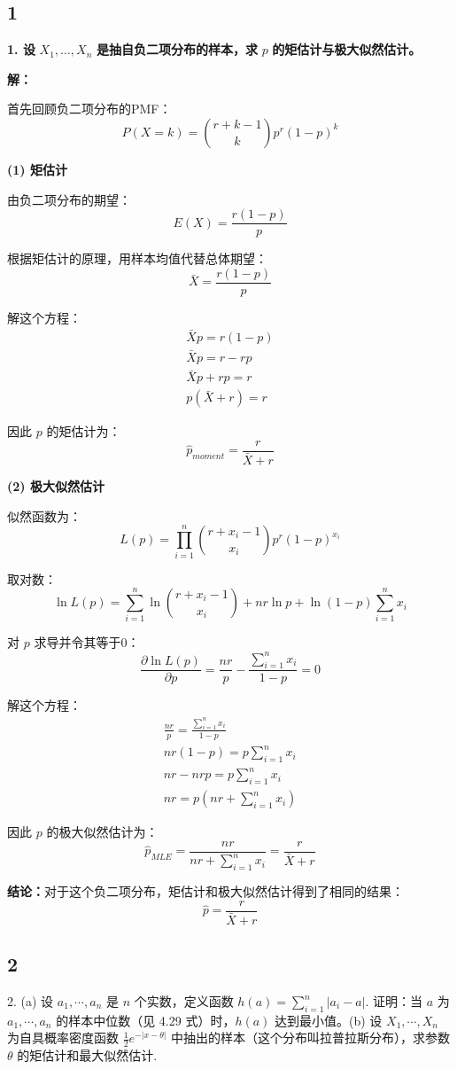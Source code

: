 \documentclass[UTF8]{report}
\theoremstyle{MyLineTheoremStyle} %
\theoremstyle{MyBlockTheoremStyle} %
\theoremstyle{MySubsubsectionStyle} %
\begin{document}
\cleardoublepage

\subsection{1}
\noindent
\textbf{1. 设} $X_1, \ldots, X_n$ \textbf{是抽自负二项分布的样本，求} $p$ \textbf{的矩估计与极大似然估计。}

\noindent
\textbf{解：} 

首先回顾负二项分布的PMF：
$$
P(X=k) = \binom{r+k-1}{k}p^r(1-p)^k
$$

\noindent
\textbf{(1) 矩估计}

由负二项分布的期望：
$$
E(X) = \frac{r(1-p)}{p}
$$

根据矩估计的原理，用样本均值代替总体期望：
$$
\bar{X} = \frac{r(1-p)}{p}
$$

解这个方程：
$$
\begin{gathered}
\bar{X}p = r(1-p) \\
\bar{X}p = r - rp \\
\bar{X}p + rp = r \\
p(\bar{X} + r) = r
\end{gathered}
$$

因此 $p$ 的矩估计为：
$$
\hat{p}_{moment} = \frac{r}{\bar{X} + r}
$$

\noindent
\textbf{(2) 极大似然估计}

似然函数为：
$$
L(p) = \prod_{i=1}^n \binom{r+x_i-1}{x_i}p^r(1-p)^{x_i}
$$

取对数：
$$
\ln L(p) = \sum_{i=1}^n \ln\binom{r+x_i-1}{x_i} + nr\ln p + \ln(1-p)\sum_{i=1}^n x_i
$$

对 $p$ 求导并令其等于0：
$$
\frac{\partial \ln L(p)}{\partial p} = \frac{nr}{p} - \frac{\sum_{i=1}^n x_i}{1-p} = 0
$$

解这个方程：
$$
\begin{gathered}
\frac{nr}{p} = \frac{\sum_{i=1}^n x_i}{1-p} \\
nr(1-p) = p\sum_{i=1}^n x_i \\
nr - nrp = p\sum_{i=1}^n x_i \\
nr = p(nr + \sum_{i=1}^n x_i)
\end{gathered}
$$

因此 $p$ 的极大似然估计为：
$$
\hat{p}_{MLE} = \frac{nr}{nr + \sum_{i=1}^n x_i} = \frac{r}{\bar{X} + r}
$$

\noindent
\textbf{结论：}对于这个负二项分布，矩估计和极大似然估计得到了相同的结果：
$$
\hat{p} = \frac{r}{\bar{X} + r}
$$

\subsection{2}
2. (a) 设 $a_1,\cdots,a_n$ 是 $n$ 个实数，定义函数 $h(a)=\sum_{i=1}^n|a_i-a|$. 证明：当 $a$ 为 $a_1,\cdots,a_n$ 的样本中位数（见 4.29 式）时，$h(a)$ 达到最小值。(b) 设 $X_1,\cdots,X_n$ 为自具概率密度函数 $\frac{1}{2}e^{-|x-\theta|}$ 中抽出的样本（这个分布叫拉普拉斯分布），求参数 $\theta$ 的矩估计和最大似然估计.
\end{document}
